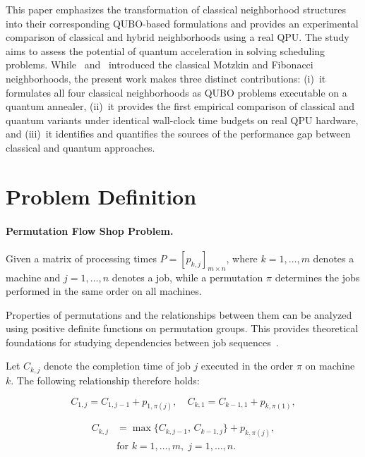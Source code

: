 \documentclass[10pt,twoside,twocolumn,a4paper]{article}
\begin{document}
This paper emphasizes the transformation of classical neighborhood structures into their corresponding QUBO-based formulations and provides an experimental comparison of classical and hybrid neighborhoods using a real QPU. The study aims to assess the potential of quantum acceleration in solving scheduling problems. While~\cite{Motzkin_PWR} and~\cite{WojewodzkiBozejko2026} introduced the classical Motzkin and Fibonacci neighborhoods, the present work makes three distinct contributions: (i)~it formulates all four classical neighborhoods as QUBO problems executable on a quantum annealer, (ii)~it provides the first empirical comparison of classical and quantum variants under identical wall-clock time budgets on real QPU hardware, and (iii)~it identifies and quantifies the sources of the performance gap between classical and quantum approaches.

\section{Problem Definition}
\paragraph{Permutation Flow Shop Problem.}
Given a matrix of processing times $P = [p_{k,j}]_{m \times n}$, where $k=1,\dots,m$ denotes a machine and $j=1,\dots,n$ denotes a job, while a permutation $\pi$ determines the jobs performed in the same order on all machines.

Properties of permutations and the relationships between them can be analyzed using positive definite functions on permutation groups. This provides theoretical foundations for studying dependencies between job sequences~\cite{Bozejko2015}.

Let $C_{k,j}$ denote the completion time of job $j$ executed in the order $\pi$ on machine $k$. The following relationship therefore holds:

\begin{equation}\label{eq_c_1j_C_k1}
    C_{1,j} = C_{1,j-1} + p_{1,\pi(j)},\quad
    C_{k,1} = C_{k-1,1} + p_{k,\pi(1)},
\end{equation}

\begin{equation}\label{eq_c_kj}
\begin{aligned}
C_{k,j} &= \max\{C_{k,j-1},\, C_{k-1,j}\} + p_{k,\pi(j)}, \\
        &\text{for } k=1,\dots,m,\; j=1,\dots,n.
\end{aligned}
\end{equation}
\end{document}
